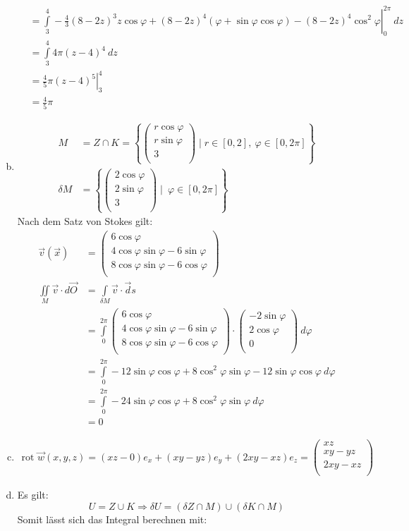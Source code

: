 \documentclass[10pt,a4paper,parskip=half]{scrartcl}
\newcommand{\vecthree}[3]{\begin{pmatrix}#1\\#2\\#3\\\end {pmatrix}}
\begin{document}
\begin{enumerate}[(a)]
\begin{align*}
               &= \left.\int\limits_{3}^4  - \frac 43 (8-2z)^3z\cos \varphi + (8-2z)^4(\varphi + \sin \varphi \cos \varphi) -(8-2z)^4\cos^2 \varphi  \right|^{2\pi}_{0}~ dz \\
                &= \int\limits_{3}^4 4\pi(z-4)^4   ~ dz \\
                &= \left. \frac 45 \pi (z-4)^5 \right|^4_3    \\
                &= \frac 45 \pi
      \end{align*}
    \item 
    \begin{align*}
        M &= Z \cap K = \left\{ \vecthree{r \cos \varphi}{r\sin \varphi}{3} \mid r \in [0,2] ,~ \varphi \in [0,2\pi] \right\}  \\
        \delta M &=  \left\{ \vecthree{2 \cos \varphi}{2\sin \varphi}{3} \mid ~ \varphi \in [0,2\pi] \right\} 
    \end{align*}
    Nach dem Satz von Stokes gilt:
    \begin{align*}
        \vec v(\vec x) &= \vecthree{6\cos \varphi }{4 \cos \varphi \sin \varphi - 6\sin \varphi}{8 \cos \varphi \sin \varphi - 6\cos \varphi } \\
        \iint\limits_M \vec v \cdot d\vec O  &= \int\limits_{\delta M} \vec v  \cdot \vec ds \\
        &= \int\limits_{0}^{2\pi} \vecthree{6\cos \varphi }{4 \cos \varphi \sin \varphi - 6\sin \varphi}{8 \cos \varphi \sin \varphi - 6\cos \varphi }  \cdot  \vecthree{-2\sin \varphi}{2\cos \varphi}{0} ~ d\varphi \\
        &= \int\limits_{0}^{2\pi} -12 \sin \varphi\cos\varphi + 8 \cos^2 \varphi \sin \varphi - 12 \sin \varphi \cos \varphi ~ d \varphi \\
        &= \int\limits_{0}^{2\pi} -24 \sin \varphi\cos\varphi + 8 \cos^2 \varphi \sin \varphi  ~ d \varphi \\
        &= 0
    \end{align*}
    \item 
    \begin{align*}
      \text{rot } \vec w(x,y,z)  = \left( xz - 0 \right)e_x + \left( xy - yz \right)e_y + \left( 2xy - xz \right)e_z = \vecthree{xz}{xy -yz}{2xy - xz}
    \end{align*}
    \item Es gilt:
    \[ U = Z \cup K \Rightarrow \delta U = (\delta Z \cap M) \cup (\delta K \cap M)  \]
    Somit lässt sich das Integral berechnen mit:
    \begin{align*}

\end{align*}
\end{enumerate}
\end{document}
